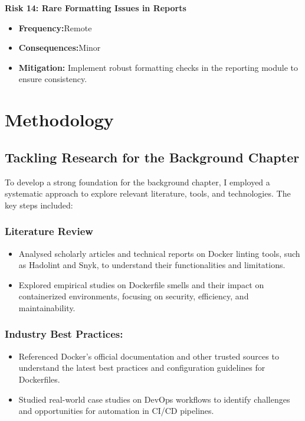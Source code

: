 \textbf{Risk 14: Rare Formatting Issues in Reports}
\begin{itemize}
    \item \textbf{Frequency:}Remote
    \item \textbf{Consequences:}Minor
    \item \textbf{Mitigation:} Implement robust formatting checks in the reporting module to ensure consistency.
\end{itemize}

\section{Methodology}
\subsection{Tackling Research for the Background Chapter}
To develop a strong foundation for the background chapter, I employed a systematic approach to explore relevant literature, tools, and technologies. The key steps included:

\subsubsection{Literature Review}
\begin{itemize}
    \item Analysed scholarly articles and technical reports on Docker linting tools, such as Hadolint and Snyk, to understand their functionalities and limitations.
    \item Explored empirical studies on Dockerfile smells and their impact on containerized environments, focusing on security, efficiency, and maintainability.
\end{itemize}

\subsubsection{Industry Best Practices:}
\begin{itemize}
    \item Referenced Docker's official documentation and other trusted sources to understand the latest best practices and configuration guidelines for Dockerfiles.
    \item Studied real-world case studies on DevOps workflows to identify challenges and opportunities for automation in CI/CD pipelines.
\end{itemize}

